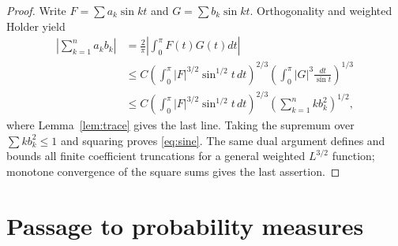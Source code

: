 \documentclass[11pt]{article}
\begin{document}
\begin{proof}
Write $F=\sum a_k\sin kt$ and $G=\sum b_k\sin kt$. Orthogonality and
weighted Holder yield
\begin{align*}
 \left|\sum_{k=1}^n a_kb_k\right|
 &=\frac2\pi\left|\int_0^\pi F(t)G(t)dt\right|\\
 &\leq C
 \left(\int_0^\pi|F|^{3/2}\sin^{1/2}t\,dt\right)^{2/3}
 \left(\int_0^\pi|G|^3\frac{dt}{\sin t}\right)^{1/3}\\
 &\leq C
 \left(\int_0^\pi|F|^{3/2}\sin^{1/2}t\,dt\right)^{2/3}
 \left(\sum_{k=1}^n k b_k^2\right)^{1/2},
\end{align*}
where Lemma~\ref{lem:trace} gives the last line. Taking the supremum over
$\sum k b_k^2\leq1$ and squaring proves \eqref{eq:sine}. The same dual
argument defines and bounds all finite coefficient truncations for a general
weighted $L^{3/2}$ function; monotone convergence of the square sums gives
the last assertion.
\end{proof}

\section{Passage to probability measures}
\end{document}
